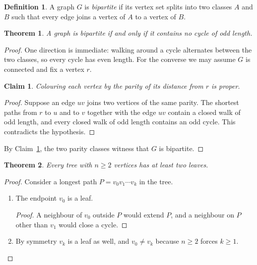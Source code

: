 \documentclass{article}
\newtheorem{theorem}{Theorem}
\newtheorem{claim}{Claim}[theorem]
\theoremstyle{definition}
\newtheorem{definition}{Definition}
\begin{document}
\begin{definition}
A graph $G$ is \emph{bipartite} if its vertex set splits into two classes
$A$ and $B$ such that every edge joins a vertex of $A$ to a vertex of $B$.
\end{definition}

\begin{theorem}\label{thm:bip}
A graph is bipartite if and only if it contains no cycle of odd length.
\end{theorem}

\begin{proof}
One direction is immediate: walking around a cycle alternates between the
two classes, so every cycle has even length. For the converse we may assume
$G$ is connected and fix a vertex $r$.

\begin{claim}\label{cl:dist}
Colouring each vertex by the parity of its distance from $r$ is proper.
\end{claim}

\begin{proof}
Suppose an edge $uv$ joins two vertices of the same parity. The shortest
paths from $r$ to $u$ and to $v$ together with the edge $uv$ contain a
closed walk of odd length, and every closed walk of odd length contains an
odd cycle. This contradicts the hypothesis.
\end{proof}

By Claim~\ref{cl:dist}, the two parity classes witness that $G$ is
bipartite.
\end{proof}

\begin{theorem}
Every tree with $n \ge 2$ vertices has at least two leaves.
\end{theorem}

\begin{proof}
Consider a longest path $P = v_0 v_1 \cdots v_k$ in the tree.
\begin{enumerate}
  \item The endpoint $v_0$ is a leaf.
  \begin{proof}
  A neighbour of $v_0$ outside $P$ would extend $P$, and a neighbour on $P$
  other than $v_1$ would close a cycle.
  \end{proof}
  \item By symmetry $v_k$ is a leaf as well, and $v_0 \neq v_k$ because
        $n \ge 2$ forces $k \ge 1$.
\end{enumerate}
\end{proof}
\end{document}
